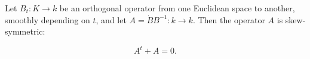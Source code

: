 Let $B_t: K \to k$ be an orthogonal operator from one Euclidean space to another, smoothly depending on $t$, and let $A = \dot{B}B^{-1}: k \to k$. Then the operator $A$ is skew-symmetric:

$$A^t + A = 0.$$